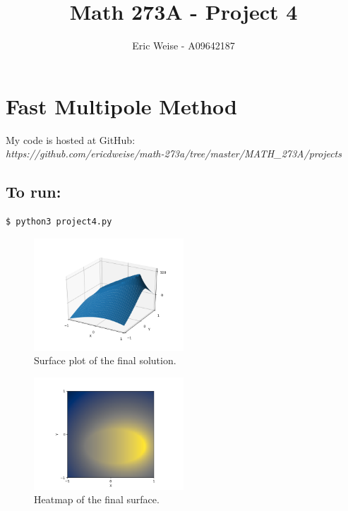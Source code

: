 \documentclass{article}
\title{Math 273A - Project 4}
\author{Eric Weise - A09642187}
\begin{document}
\maketitle

\section*{Fast Multipole Method}

My code is hosted at GitHub:\\
{\it https://github.com/ericdweise/math-273a/tree/master/MATH\_273A/projects}

\subsection*{To run:}
\begin{verbatim}$ python3 project4.py\end{verbatim}

\begin{figure}[H]
    \caption{Surface plot of the final solution.}
    \centering
        \includegraphics[width=0.5\textwidth]{surface.png}
\end{figure}

\begin{figure}[H]
    \caption{Heatmap of the final surface.}
    \centering
        \includegraphics[width=0.5\textwidth]{heatmap.png}
\end{figure}
\end{document}
